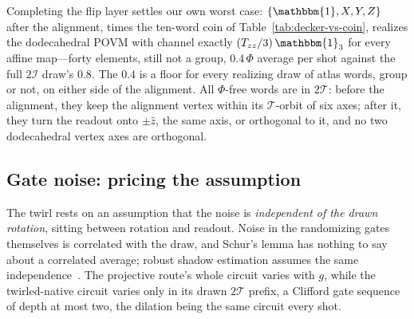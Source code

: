 \documentclass[11pt, oneside, openany]{scrbook}
\newcommand{\Id}{\mathbbm{1}}
\newcommand{\Tgroup}{\mathcal{T}}  %
\newcommand{\Igroup}{\mathcal{I}}  %
\newcommand{\TwoT}{2\Tgroup}
\newcommand{\TwoI}{2\Igroup}
\begin{document}

Completing the flip layer settles our own worst case: $\{\Id, X, Y, Z\}$ after the alignment, times the ten-word coin of Table~\ref{tab:decker-vs-coin}, realizes the dodecahedral POVM with channel exactly $(T_{zz}/3)\,\Id_3$ for every affine map---forty elements, still not a group, $0.4\,\Phi$ average per shot against the full $\TwoI$ draw's $0.8$. The $0.4$ is a floor for every realizing draw of atlas words, group or not, on either side of the alignment. All $\Phi$-free words are in $\TwoT$: before the alignment, they keep the alignment vertex within its $\Tgroup$-orbit of six axes; after it, they turn the readout onto $\pm\hat z$, the same axis, or orthogonal to it, and no two dodecahedral vertex axes are orthogonal.

\subsection{Gate noise: pricing the assumption} \label{sec:shadows:gatenoise}

The twirl rests on an assumption that the noise is \textit{independent of the drawn rotation}, sitting between rotation and readout. Noise in the randomizing gates themselves is correlated with the draw, and Schur's lemma has nothing to say about a correlated average; robust shadow estimation assumes the same independence~\cite[Thm.~3]{chen2021robustshadowestimationa}. The projective route's whole circuit varies with $g$, while the twirled-native circuit varies only in its drawn $\TwoT$ prefix, a Clifford gate sequence of depth at most two, the dilation being the same circuit every shot.
\end{document}
